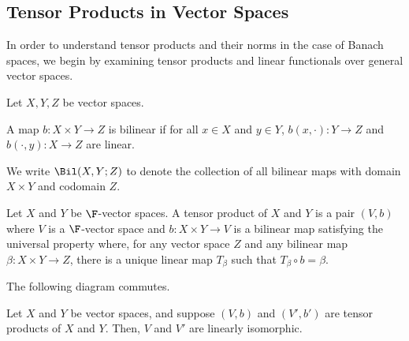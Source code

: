 \documentclass[10pt]{mypackage}
\begin{document}
\subsection{Tensor Products in Vector Spaces}%
In order to understand tensor products and their norms in the case of Banach spaces, we begin by examining tensor products and linear functionals over general vector spaces.
\begin{definition}
  Let $X,Y,Z$ be vector spaces.\newline

A map $b: X\times Y \rightarrow Z$ is bilinear if for all $x\in X$ and $y\in Y$, $b\left(x,\cdot\right): Y\rightarrow Z$ and $b\left(\cdot,y\right):X\rightarrow Z$ are linear.\newline

We write $\Bil(X,Y;Z)$ to denote the collection of all bilinear maps with domain $X\times Y$ and codomain $Z$.
\end{definition}
\begin{definition}
  Let $X$ and $Y$ be $\F$-vector spaces. A tensor product of $X$ and $Y$ is a pair $\left(V,b\right)$ where $V$ is a $\F$-vector space and $b: X\times Y\rightarrow V$ is a bilinear map satisfying the universal property where, for any vector space $Z$ and any bilinear map $\beta: X\times Y\rightarrow Z$, there is a unique linear map $T_{\beta}$ such that $T_{\beta}\circ b = \beta$.\newline

  The following diagram commutes.
  \begin{center}
  \end{center}
\end{definition}
\begin{fact}[]
  Let $X$ and $Y$ be vector spaces, and suppose $\left(V,b\right)$  and $\left(V',b'\right)$ are tensor products of $X$ and $Y$. Then, $V$ and $V'$ are linearly isomorphic.
\end{fact}
\end{document}
